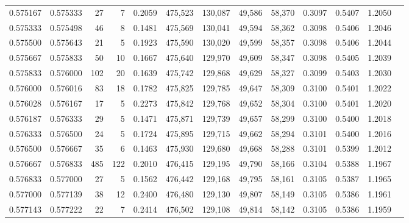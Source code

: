 \begin{tabular}{rrrrrrrrrrrrr}
0.575167 & 0.575333 &    27 &   7 &                                     0.2059 & 475,523 & 130,087 &  49,586 &  58,370 & 0.3097 & 0.5407 & 1.2050 \\
0.575333 & 0.575498 &    46 &   8 &                                     0.1481 & 475,569 & 130,041 &  49,594 &  58,362 & 0.3098 & 0.5406 & 1.2046 \\
0.575500 & 0.575643 &    21 &   5 &                                     0.1923 & 475,590 & 130,020 &  49,599 &  58,357 & 0.3098 & 0.5406 & 1.2044 \\
0.575667 & 0.575833 &    50 &  10 &                                     0.1667 & 475,640 & 129,970 &  49,609 &  58,347 & 0.3098 & 0.5405 & 1.2039 \\
0.575833 & 0.576000 &   102 &  20 &                                     0.1639 & 475,742 & 129,868 &  49,629 &  58,327 & 0.3099 & 0.5403 & 1.2030 \\
0.576000 & 0.576016 &    83 &  18 &                                     0.1782 & 475,825 & 129,785 &  49,647 &  58,309 & 0.3100 & 0.5401 & 1.2022 \\
0.576028 & 0.576167 &    17 &   5 &                                     0.2273 & 475,842 & 129,768 &  49,652 &  58,304 & 0.3100 & 0.5401 & 1.2020 \\
0.576187 & 0.576333 &    29 &   5 &                                     0.1471 & 475,871 & 129,739 &  49,657 &  58,299 & 0.3100 & 0.5400 & 1.2018 \\
0.576333 & 0.576500 &    24 &   5 &                                     0.1724 & 475,895 & 129,715 &  49,662 &  58,294 & 0.3101 & 0.5400 & 1.2016 \\
0.576500 & 0.576667 &    35 &   6 &                                     0.1463 & 475,930 & 129,680 &  49,668 &  58,288 & 0.3101 & 0.5399 & 1.2012 \\
0.576667 & 0.576833 &   485 & 122 &                                     0.2010 & 476,415 & 129,195 &  49,790 &  58,166 & 0.3104 & 0.5388 & 1.1967 \\
0.576833 & 0.577000 &    27 &   5 &                                     0.1562 & 476,442 & 129,168 &  49,795 &  58,161 & 0.3105 & 0.5387 & 1.1965 \\
0.577000 & 0.577139 &    38 &  12 &                                     0.2400 & 476,480 & 129,130 &  49,807 &  58,149 & 0.3105 & 0.5386 & 1.1961 \\
0.577143 & 0.577222 &    22 &   7 &                                     0.2414 & 476,502 & 129,108 &  49,814 &  58,142 & 0.3105 & 0.5386 & 1.1959 \\

\end{tabular}
